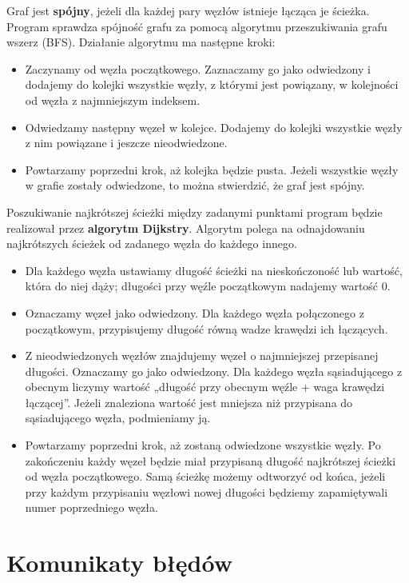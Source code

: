 \documentclass[]{article}
\begin{document}
Graf jest \textbf{spójny}, jeżeli dla każdej pary węzłów istnieje łącząca je ścieżka. Program sprawdza spójność grafu za pomocą algorytmu przeszukiwania grafu wszerz (BFS). Działanie algorytmu ma następne kroki:
\begin{itemize}
\item
  Zaczynamy od węzła początkowego. Zaznaczamy go jako odwiedzony i dodajemy do kolejki wszystkie węzły, z którymi jest powiązany, w kolejności od węzła z najmniejszym indeksem.
\item
  Odwiedzamy następny węzeł w kolejce. Dodajemy do kolejki wszystkie węzły z nim powiązane i jeszcze nieodwiedzone.
\item
  Powtarzamy poprzedni krok, aż kolejka będzie pusta. Jeżeli wszystkie węzły w grafie zostały odwiedzone, to można stwierdzić, że graf jest spójny.
\end{itemize}

Poszukiwanie najkrótszej ścieżki między zadanymi punktami program będzie realizował przez \textbf{algorytm Dijkstry}. Algorytm polega na odnajdowaniu najkrótszych ścieżek od zadanego węzła do każdego innego. 
\begin{itemize}
\item
  Dla każdego węzła ustawiamy długość ścieżki na nieskończoność lub wartość, która do niej dąży; długości przy węźle początkowym nadajemy wartość 0. 
\item
  Oznaczamy węzeł jako odwiedzony. Dla każdego węzła połączonego z początkowym, przypisujemy długość równą wadze krawędzi ich łączących.
\item
  Z nieodwiedzonych węzłów znajdujemy węzeł o najmniejszej przepisanej długości. Oznaczamy go jako odwiedzony. Dla każdego węzła sąsiadującego z obecnym liczymy wartość „długość przy obecnym węźle + waga krawędzi łączącej”. Jeżeli znaleziona wartość jest mniejsza niż przypisana do sąsiadującego węzła, podmieniamy ją.
\item
  Powtarzamy poprzedni krok, aż zostaną odwiedzone wszystkie węzły. Po zakończeniu każdy węzeł będzie miał przypisaną długość najkrótszej ścieżki od węzła początkowego. Samą ścieżkę możemy odtworzyć od końca, jeżeli przy każdym przypisaniu węzłowi nowej długości będziemy zapamiętywali numer poprzedniego węzła.
\end{itemize}

\section{Komunikaty błędów}\label{header-n281}
\end{document}
